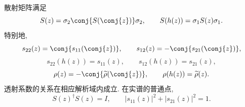 \begin{proposition}[散射矩阵与反射数据的约化]\label{prop:scattering-symmetry}
散射矩阵满足
\begin{equation}\label{eq:scattering-symmetry}
S(z)=\sigma_2\conj{S(\conj{z})}\sigma_2,\qquad
S(h(z))=\sigma_1S(z)\sigma_1.
\end{equation}
特别地,
\begin{equation}\label{eq:sconj}
s_{22}(z)=\conj{s_{11}(\conj{z})},\qquad
s_{12}(z)=-\conj{s_{21}(\conj{z})},
\end{equation}
\begin{equation}\label{eq:ssheet}
s_{22}(h(z))=s_{11}(z),\qquad s_{12}(h(z))=s_{21}(z),
\end{equation}
\begin{equation}\label{eq:reflection-symmetry}
\rho(z)=-\conj{\widetilde\rho(\conj{z})},\qquad
\rho(h(z))=\widetilde\rho(z).
\end{equation}
透射系数的关系在相应解析域内成立. 在实谱的普通点,
\begin{equation}\label{eq:scattering-unitarity}
S(z)^\dagger S(z)=I,\qquad
|s_{11}(z)|^2+|s_{21}(z)|^2=1.
\end{equation}
\end{proposition}
